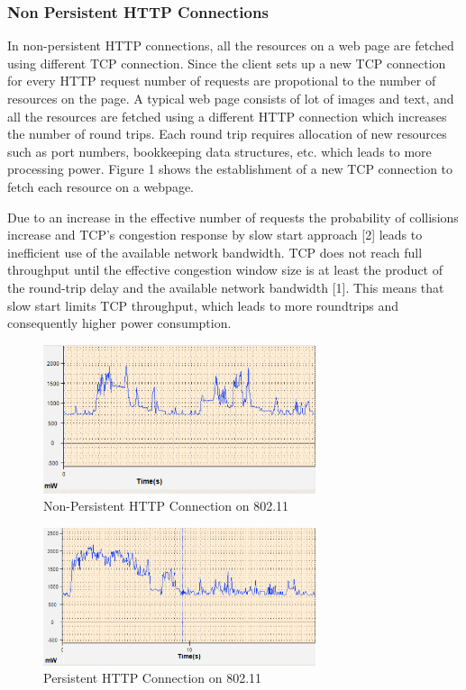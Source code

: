\documentclass{sigplanconf}
\begin{document}
\subsubsection{ Non Persistent HTTP Connections}

In non-persistent HTTP connections, all the resources on a web page are fetched using different TCP connection. Since the client sets up a new TCP connection for every HTTP request number of requests are propotional to the number of resources on the page. A typical web page consists of lot of images and text, and all the resources are fetched using a different HTTP connection which increases the number of round trips. Each round trip requires allocation of new resources such as port numbers, bookkeeping data structures, etc. which leads to more processing power. Figure 1 shows the establishment of a new TCP connection to fetch each resource on a webpage.

Due to an increase in the effective number of requests the probability of collisions increase and TCP’s congestion response by slow start approach [2] leads to inefficient use of  the available network bandwidth. TCP does not reach full throughput until the effective congestion window size is at least the product of the round-trip delay and the available network bandwidth [1]. This means that slow start limits TCP throughput, which leads to more roundtrips and consequently higher power consumption.

\begin{figure}[ht!]
\centering
\includegraphics[width=80mm]{powerconsumption2.png}
\caption{Non-Persistent HTTP Connection on 802.11}
\label{fig:sp_gd_mnist}
\end{figure}




\begin{figure}[ht!]
\centering
\includegraphics[width=80mm]{powerconsumption1.png}
\caption{Persistent HTTP Connection on 802.11 }
\label{fig:sp_gd_mnist}
\end{figure}
\end{document}
